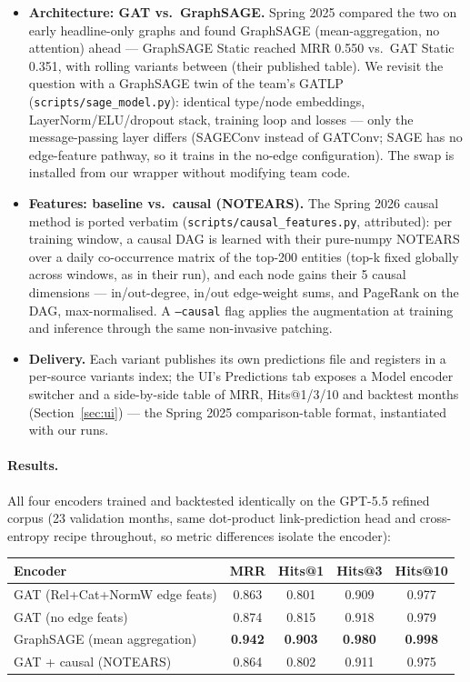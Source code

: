 \documentclass[11pt]{article}
\begin{document}
\begin{itemize}
  \item \textbf{Architecture: GAT vs.\ GraphSAGE.} Spring 2025 compared the two on early headline-only graphs and found GraphSAGE (mean-aggregation, no attention) ahead --- GraphSAGE Static reached MRR 0.550 vs.\ GAT Static 0.351, with rolling variants between (their published table). We revisit the question with a GraphSAGE twin of the team's GATLP (\texttt{scripts/sage\_model.py}): identical type/node embeddings, LayerNorm/ELU/dropout stack, training loop and losses --- only the message-passing layer differs (SAGEConv instead of GATConv; SAGE has no edge-feature pathway, so it trains in the no-edge configuration). The swap is installed from our wrapper without modifying team code.
  \item \textbf{Features: baseline vs.\ causal (NOTEARS).} The Spring 2026 causal method is ported verbatim (\texttt{scripts/causal\_features.py}, attributed): per training window, a causal DAG is learned with their pure-numpy NOTEARS over a daily co-occurrence matrix of the top-200 entities (top-k fixed globally across windows, as in their run), and each node gains their 5 causal dimensions --- in/out-degree, in/out edge-weight sums, and PageRank on the DAG, max-normalised. A \texttt{--causal} flag applies the augmentation at training and inference through the same non-invasive patching.
  \item \textbf{Delivery.} Each variant publishes its own predictions file and registers in a per-source variants index; the UI's Predictions tab exposes a Model encoder switcher and a side-by-side table of MRR, Hits@1/3/10 and backtest months (Section~\ref{sec:ui}) --- the Spring 2025 comparison-table format, instantiated with our runs.
\end{itemize}

\paragraph{Results.} All four encoders trained and backtested identically on the GPT-5.5 refined corpus (23 validation months, same dot-product link-prediction head and cross-entropy recipe throughout, so metric differences isolate the encoder):

\begin{center}
\begin{tabular}{lcccc}
\hline
Encoder & MRR & Hits@1 & Hits@3 & Hits@10 \\
\hline
GAT (Rel+Cat+NormW edge feats) & 0.863 & 0.801 & 0.909 & 0.977 \\
GAT (no edge feats) & 0.874 & 0.815 & 0.918 & 0.979 \\
GraphSAGE (mean aggregation) & \textbf{0.942} & \textbf{0.903} & \textbf{0.980} & \textbf{0.998} \\
GAT + causal (NOTEARS) & 0.864 & 0.802 & 0.911 & 0.975 \\
\hline
\end{tabular}
\end{center}
\end{document}
